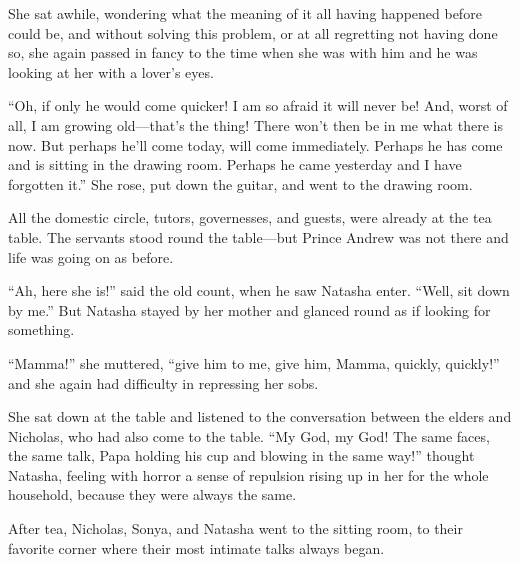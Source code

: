 She sat awhile, wondering what the meaning of it all having
happened before could be, and without solving this problem, or at
all regretting not having done so, she again passed in fancy to
the time when she was with him and he was looking at her with a
lover's eyes.

``Oh, if only he would come quicker! I am so afraid it will never
be!  And, worst of all, I am growing old---that's the thing!
There won't then be in me what there is now. But perhaps he'll
come today, will come immediately. Perhaps he has come and is
sitting in the drawing room.  Perhaps he came yesterday and I
have forgotten it.'' She rose, put down the guitar, and went to
the drawing room.

All the domestic circle, tutors, governesses, and guests, were
already at the tea table. The servants stood round the
table---but Prince Andrew was not there and life was going on as
before.

``Ah, here she is!'' said the old count, when he saw Natasha
enter. ``Well, sit down by me.'' But Natasha stayed by her mother
and glanced round as if looking for something.

``Mamma!'' she muttered, ``give him to me, give him, Mamma,
quickly, quickly!'' and she again had difficulty in repressing
her sobs.

She sat down at the table and listened to the conversation
between the elders and Nicholas, who had also come to the
table. ``My God, my God!  The same faces, the same talk, Papa
holding his cup and blowing in the same way!'' thought Natasha,
feeling with horror a sense of repulsion rising up in her for the
whole household, because they were always the same.

After tea, Nicholas, Sonya, and Natasha went to the sitting room,
to their favorite corner where their most intimate talks always
began.


